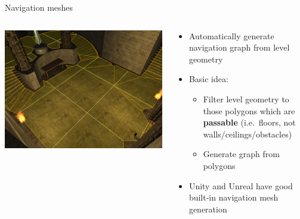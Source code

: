 \begin{frame}{Navigation meshes}
	\begin{columns}
		\begin{column}{0.4\textwidth}
			\includegraphics[width=\textwidth]{navmesh} %
		\end{column}
		\begin{column}{0.58\textwidth}
			\begin{itemize}
				\pause\item Automatically generate navigation graph from level geometry
				\pause\item Basic idea:
					\begin{itemize}
						\pause\item Filter level geometry to those polygons which are \textbf{passable}
							(i.e.\ floors, not walls/ceilings/obstacles)
						\pause\item Generate graph from polygons
					\end{itemize}
				\pause\item Unity and Unreal have good built-in navigation mesh generation
			\end{itemize}
		\end{column}
	\end{columns}
\end{frame}

